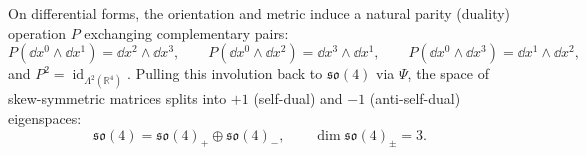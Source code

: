 On differential forms, the orientation and metric induce a natural parity (duality) operation $P$ exchanging complementary pairs:
\begin{equation}
\label{eq:m1_1_form_parity_map}
P(\dd x^0 \wedge \dd x^1) = \dd x^2 \wedge \dd x^3, \qquad P(\dd x^0 \wedge \dd x^2) = \dd x^3 \wedge \dd x^1, \qquad P(\dd x^0 \wedge \dd x^3) = \dd x^1 \wedge \dd x^2,
\end{equation}
and $P^2 = \operatorname{id}_{\Lambda^2(\mathbb{R}^4)}$. Pulling this involution back to $\mathfrak{so}(4)$ via $\Psi$, the space of skew-symmetric matrices splits into $+1$ (self-dual) and $-1$ (anti-self-dual) eigenspaces:
\begin{equation}
\label{eq:m1_1_so4_chiral_split}
\mathfrak{so}(4) = \mathfrak{so}(4)_+ \oplus \mathfrak{so}(4)_-, \qquad \dim \mathfrak{so}(4)_\pm = 3.
\end{equation}

